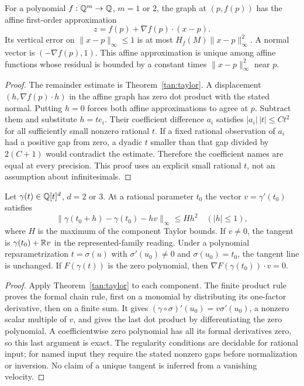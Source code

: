 \begin{corollary}
\label{tan:graphs}
For a polynomial $f:\mathbb Q^m\to\mathbb Q$, $m=1$ or $2$, the graph at
$(p,f(p))$ has the affine first-order approximation
\[
 z=f(p)+\nabla f(p)\cdot(x-p).
\]
Its vertical error on $\|x-p\|_\infty\le1$ is at most
$H_f(M)\|x-p\|_\infty^2$. A normal vector is
$(-\nabla f(p),1)$. This affine approximation is unique among affine
functions whose residual is bounded by a constant times
$\|x-p\|_\infty^2$ near $p$.
\end{corollary}
\begin{proof}
The remainder estimate is Theorem~\ref{tan:taylor}. A displacement
$(h,\nabla f(p)\cdot h)$ in the affine graph has zero dot product
with the stated normal. Putting $h=0$ forces both affine approximations to agree at $p$.
Subtract them and substitute $h=te_i$. Their coefficient difference
$a_i$ satisfies $|a_i|\,|t|\le C t^2$ for all sufficiently small
nonzero rational $t$. If a fixed rational observation of $a_i$ had a
positive gap from zero, a dyadic $t$ smaller than that gap divided by
$2(C+1)$ would contradict the estimate. Therefore the coefficient
names are equal at every precision. This proof uses an explicit small
rational $t$, not an assumption about infinitesimals.
\end{proof}

\begin{theorem}
\label{tan:parametric}
Let $\gamma(t)\in\mathbb Q[t]^d$, $d=2$ or $3$. At a rational parameter $t_0$ the vector
$v=\gamma'(t_0)$ satisfies
\[
 \|\gamma(t_0+h)-\gamma(t_0)-hv\|_\infty\le Hh^2
 \quad(|h|\le1),
\]
where $H$ is the maximum of the component Taylor bounds. If $v\ne0$,
the tangent is $\gamma(t_0)+\mathbb R v$ in the represented-family reading.
Under a polynomial reparametrization $t=\sigma(u)$ with
$\sigma'(u_0)\ne0$ and $\sigma(u_0)=t_0$, the tangent line is
unchanged. If $F(\gamma(t))$ is the zero polynomial, then
$\nabla F(\gamma(t_0))\cdot v=0$.
\end{theorem}
\begin{proof}
Apply Theorem~\ref{tan:taylor} to each component. The finite product
rule proves the formal chain rule, first on a monomial by distributing
its one-factor derivative, then on a finite sum. It gives
$(\gamma\circ\sigma)'(u_0)=v\sigma'(u_0)$, a nonzero scalar
multiple of $v$, and gives the last dot product by differentiating
the zero polynomial. A coefficientwise zero polynomial has all its
formal derivatives zero, so this last argument is exact. The regularity
conditions are decidable for rational input; for named input they
require the stated nonzero gaps before normalization or inversion.
No claim of a unique tangent is inferred from a vanishing velocity.
\end{proof}

